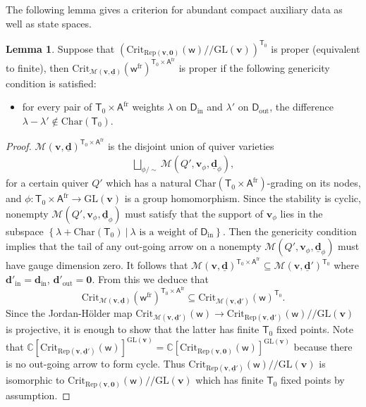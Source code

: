 \documentclass[10pt]{amsart}
\theoremstyle{definition}
\newtheorem{Lemma}[Theorem]{Lemma}
\numberwithin{equation}{section}
\newcommand{\GL}{\mathrm{GL}}
\newcommand{\Crit}{\mathrm{Crit}}
\newcommand{\bC}{\mathbb{C}}
\newcommand{\bQ}{\mathbb{Q}}
\newcommand{\bZ}{\mathbb{Z}}
\newcommand{\bv}{\mathbf{v}}
\newcommand{\bd}{\mathbf{d}}
\newcommand{\cM}{\mathcal{M}}
\newcommand{\sA}{\mathsf{A}}
\newcommand{\sT}{\mathsf{T}}
\newcommand{\sw}{\mathsf{w}}
\newcommand{\In}{\operatorname{in}}
\newcommand{\Out}{\operatorname{out}}
\begin{document}
The following lemma gives a criterion for abundant compact auxiliary data as well as state spaces.

\begin{Lemma}\label{lem abundant compact}
Suppose that $\left(\Crit_{\mathrm{Rep}(\bv,\mathbf 0)}(\sw)/\!\!/ \GL(\bv)\right)^{\sT_0}$ is proper (equivalent to finite), then $\Crit_{\cM(\bv,\underline{\bd})}(\sw^{\mathrm{fr}})^{\sT_0\times \sA^{\mathrm{fr}}}$ is proper if the following genericity condition is satisfied:
\begin{itemize}
    \item[] for every pair of $\sT_0\times \sA^{\mathrm{fr}}$ weights $\lambda$ on $\mathsf D_{\In}$ and $\lambda'$ on $\mathsf D_{\Out}$, the difference $\lambda-\lambda'\notin \mathrm{Char}(\sT_0)$.
\end{itemize}
\end{Lemma}


\begin{proof}
$\cM(\bv,\underline{\bd})^{\sT_0\times \sA^{\mathrm{fr}}}$ is the disjoint union of quiver varieties 
\begin{align*}
    \bigsqcup_{\phi/\sim}\cM(Q',\bv_{\phi},\underline{\bd}_{\phi}),
\end{align*}
for a certain quiver $Q'$ which has a natural $\mathrm{Char}(\sT_0\times \sA^{\mathrm{fr}})$-grading on its nodes, and $\phi\colon \sT_0\times \sA^{\mathrm{fr}}\to \GL(\bv)$ is a group homomorphism. Since the stability is cyclic, nonempty $\cM(Q',\bv_{\phi},\underline{\bd}_{\phi})$ must satisfy that the support of $\bv_{\phi}$ lies in the subspace $\left\{\lambda+\mathrm{Char}(\sT_0)\:|\:\lambda\text{ is a weight of $\mathsf D_{\In}$}\right\}$. Then the genericity condition implies that the tail of any out-going arrow on a nonempty $\cM(Q',\bv_{\phi},\underline{\bd}_{\phi})$ must have gauge dimension zero. It follows that $\cM(\bv,\underline{\bd})^{\sT_0\times \sA^{\mathrm{fr}}}\subseteq \cM(\bv,\underline{\bd}')^{\sT_0}$ where $\bd'_{\In}=\bd_{\In}$, $\bd'_{\Out}=\mathbf 0$. From this we deduce that $$\Crit_{\cM(\bv,\underline{\bd})}(\sw^{\mathrm{fr}})^{\sT_0\times \sA^{\mathrm{fr}}}\subseteq \Crit_{\cM(\bv,\underline{\bd}')}(\sw)^{\sT_0}.$$
Since the Jordan-H\"older map $\Crit_{\cM(\bv,\underline{\bd}')}(\sw)\to \Crit_{\mathrm{Rep}(\bv,\underline{\bd}')}(\sw)/\!\!/ \GL(\bv)$ is projective, it is enough to show that the latter has finite $\sT_0$ fixed points. Note that $\bC\left[\Crit_{\mathrm{Rep}(\bv,\underline{\bd}')}(\sw)\right]^{\GL(\bv)}=\bC\left[\Crit_{\mathrm{Rep}(\bv,\mathbf 0)}(\sw)\right]^{\GL(\bv)}$ because there is no out-going arrow to form cycle. Thus $\Crit_{\mathrm{Rep}(\bv,\underline{\bd}')}(\sw)/\!\!/ \GL(\bv)$ is isomorphic to $ \Crit_{\mathrm{Rep}(\bv,\mathbf 0)}(\sw)/\!\!/ \GL(\bv)$ which has finite $\sT_0$ fixed points by assumption.
\end{proof}
\end{document}
